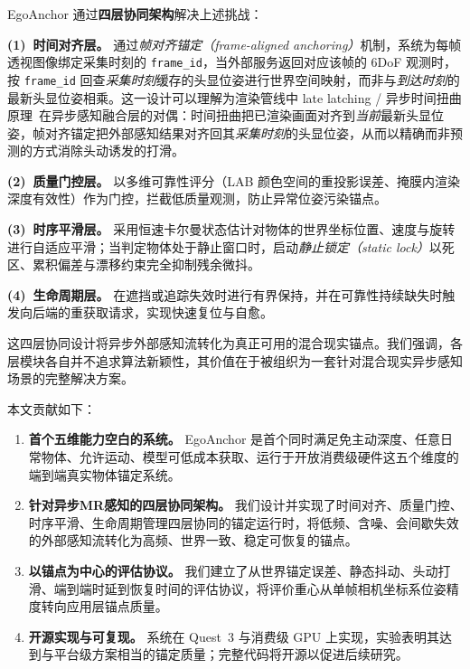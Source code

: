 \documentclass[review]{vgtc}
\begin{document}
EgoAnchor 通过\textbf{四层协同架构}解决上述挑战：

\noindent\textbf{(1)~时间对齐层。} 通过\emph{帧对齐锚定（frame-aligned anchoring）}机制，系统为每帧透视图像绑定采集时刻的 \texttt{frame\_id}，当外部服务返回对应该帧的 6DoF 观测时，按 \texttt{frame\_id} 回查\emph{采集时刻}缓存的头显位姿进行世界空间映射，而非与\emph{到达时刻}的最新头显位姿相乘。这一设计可以理解为渲染管线中 late latching / 异步时间扭曲原理~\cite{vanwaveren2016atw,mark1997postrendering}在异步感知融合层的对偶：时间扭曲把已渲染画面对齐到\emph{当前}最新头显位姿，帧对齐锚定把外部感知结果对齐回其\emph{采集时刻}的头显位姿，从而以精确而非预测的方式消除头动诱发的打滑。

\noindent\textbf{(2)~质量门控层。} 以多维可靠性评分（LAB 颜色空间的重投影误差、掩膜内渲染深度有效性）作为门控，拦截低质量观测，防止异常位姿污染锚点。

\noindent\textbf{(3)~时序平滑层。} 采用恒速卡尔曼状态估计对物体的世界坐标位置、速度与旋转进行自适应平滑；当判定物体处于静止窗口时，启动\emph{静止锁定（static lock）}以死区、累积偏差与漂移约束完全抑制残余微抖。

\noindent\textbf{(4)~生命周期层。} 在遮挡或追踪失效时进行有界保持，并在可靠性持续缺失时触发向后端的重获取请求，实现快速复位与自愈。

这四层协同设计将异步外部感知流转化为真正可用的混合现实锚点。我们强调，各层模块各自并不追求算法新颖性，其价值在于被组织为一套针对混合现实异步感知场景的完整解决方案。

本文贡献如下：
\begin{enumerate}[leftmargin=1.4em]
  \item \textbf{首个五维能力空白的系统。} EgoAnchor 是首个同时满足免主动深度、任意日常物体、允许运动、模型可低成本获取、运行于开放消费级硬件这五个维度的端到端真实物体锚定系统。
  \item \textbf{针对异步MR感知的四层协同架构。} 我们设计并实现了时间对齐、质量门控、时序平滑、生命周期管理四层协同的锚定运行时，将低频、含噪、会间歇失效的外部感知流转化为高频、世界一致、稳定可恢复的锚点。
  \item \textbf{以锚点为中心的评估协议。} 我们建立了从世界锚定误差、静态抖动、头动打滑、端到端时延到恢复时间的评估协议，将评价重心从单帧相机坐标系位姿精度转向应用层锚点质量。
  \item \textbf{开源实现与可复现。} 系统在 Quest~3 与消费级 GPU 上实现，实验表明其达到与平台级方案相当的锚定质量；完整代码将开源以促进后续研究。
\end{enumerate}

\end{document}
